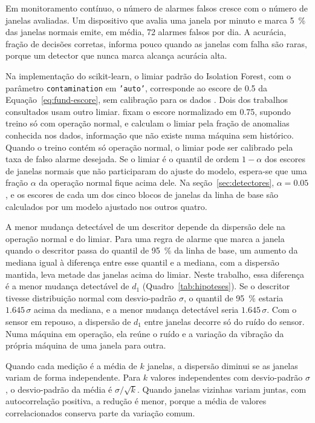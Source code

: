 Em monitoramento contínuo, o número de alarmes falsos cresce com o número de janelas avaliadas. Um dispositivo que avalia uma janela por minuto e marca \SI{5}{\percent} das janelas normais emite, em média, \num{72} alarmes falsos por dia. A acurácia, fração de decisões corretas, informa pouco quando as janelas com falha são raras, porque um detector que nunca marca alcança acurácia alta.

Na implementação do scikit-learn, o limiar padrão do Isolation Forest, com o parâmetro \texttt{contamination} em \texttt{'auto'}, corresponde ao escore de \num{0,5} da Equação~\eqref{eq:fund-escore}, sem calibração para os dados \cite{liu2008,scikitlearn2026}. Dois dos trabalhos consultados usam outro limiar.  fixam o escore normalizado em \num{0,75}, supondo treino só com operação normal, e  calculam o limiar pela fração de anomalias conhecida nos dados, informação que não existe numa máquina sem histórico. Quando o treino contém só operação normal, o limiar pode ser calibrado pela taxa de falso alarme desejada. Se o limiar é o quantil de ordem $1-\alpha$ dos escores de janelas normais que não participaram do ajuste do modelo, espera-se que uma fração $\alpha$ da operação normal fique acima dele. Na seção~\ref{sec:detectores}, $\alpha = \num{0,05}$, e os escores de cada um dos cinco blocos de janelas da linha de base são calculados por um modelo ajustado nos outros quatro.

A menor mudança detectável de um descritor depende da dispersão dele na operação normal e do limiar. Para uma regra de alarme que marca a janela quando o descritor passa do quantil de \SI{95}{\percent} da linha de base, um aumento da mediana igual à diferença entre esse quantil e a mediana, com a dispersão mantida, leva metade das janelas acima do limiar. Neste trabalho, essa diferença é a menor mudança detectável de $d_1$ (Quadro~\ref{tab:hipoteses}). Se o descritor tivesse distribuição normal com desvio-padrão $\sigma$, o quantil de \SI{95}{\percent} estaria $\num{1,645}\,\sigma$ acima da mediana, e a menor mudança detectável seria $\num{1,645}\,\sigma$. Com o sensor em repouso, a dispersão de $d_1$ entre janelas decorre só do ruído do sensor. Numa máquina em operação, ela reúne o ruído e a variação da vibração da própria máquina de uma janela para outra.

Quando cada medição é a média de $k$ janelas, a dispersão diminui se as janelas variam de forma independente. Para $k$ valores independentes com desvio-padrão $\sigma$, o desvio-padrão da média é $\sigma/\sqrt{k}$. Quando janelas vizinhas variam juntas, com autocorrelação positiva, a redução é menor, porque a média de valores correlacionados conserva parte da variação comum.

